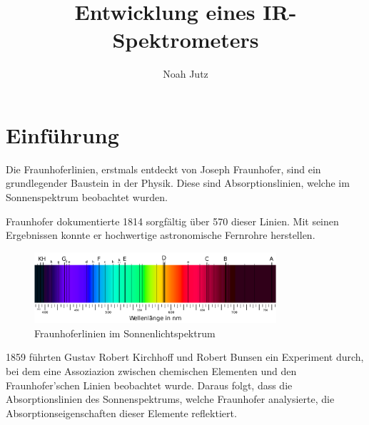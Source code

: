\documentclass{article}
\title{Entwicklung eines IR-Spektrometers}
\author{Noah Jutz}
\date{}
\begin{document}
\maketitle
\tableofcontents


\section{Einführung}



Die Fraunhoferlinien, erstmals entdeckt von Joseph Fraunhofer, sind ein grundlegender Baustein in der Physik. Diese sind Absorptionslinien, welche im Sonnenspektrum beobachtet wurden.

Fraunhofer dokumentierte 1814 sorgfältig über 570 dieser Linien. Mit seinen Ergebnissen konnte er hochwertige astronomische Fernrohre herstellen.

\begin{figure}[H]
    \centering
    \includegraphics[width=0.8\textwidth]{2000px-Fraunhofer_lines_DE.svg.png}
    \caption{Fraunhoferlinien im Sonnenlichtspektrum}
\end{figure}

1859 führten Gustav Robert Kirchhoff und Robert Bunsen ein Experiment durch, bei dem eine Assoziazion zwischen chemischen Elementen und den Fraunhofer'schen Linien beobachtet wurde. Daraus folgt, dass die Absorptionslinien des Sonnenspektrums, welche Fraunhofer analysierte, die Absorptionseigenschaften dieser Elemente reflektiert.
\end{document}

